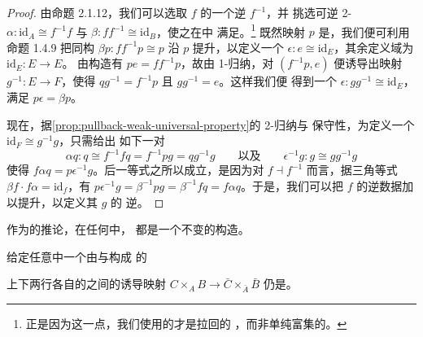 \begin{proof}
由命题 2.1.12，我们可以选取 $f$ 的一个\trAdjointEquivalence{}逆 $f^{-1}$，并%
挑选可逆 2-\trCell{} $\alpha\colon\mathrm{id}_A\cong f^{-1}f$ 与%
$\beta\colon ff^{-1}\cong\mathrm{id}_B$，使之在\trHomotopyTwoCategory{}中%
满足\trTriangleEqualities{}。\footnote{正是因为这一点，我们使用的才是拉回的%
\trBicategory\trUniversalProperty，而非单纯富集的\trUniversalProperty。}
既然映射 $p$ 是\trIsofibration{}，我们便可利用命题 1.4.9 把同构%
$\beta p\colon ff^{-1}p\cong p$ 沿 $p$ 提升，以定义一个\trIsomorphism{}%
$\epsilon\colon e\cong\mathrm{id}_E$，其余定义域为 $\mathrm{id}_E\colon E\to E$。%
由构造有 $pe=ff^{-1}p$，故由 1-\trCell{}归纳，对 $(f^{-1}p,e)$ 便诱导出映射%
$g^{-1}\colon E\to F$，使得 $qg^{-1}=f^{-1}p$ 且 $gg^{-1}=e$。这样我们便%
得到一个\trIsomorphism{} $\epsilon\colon gg^{-1}\cong\mathrm{id}_E$，满足%
$p\epsilon=\beta p$。

现在，据\cref{prop:pullback-weak-universal-property}的 2-\trCell{}归纳与%
保守性，为定义一个\trIsomorphism{} $\mathrm{id}_F\cong g^{-1}g$，只需给出%
如下一对\trIsomorphism
\[
\alpha q\colon q\cong f^{-1}fq=f^{-1}pg=qg^{-1}g
\qquad\text{以及}\qquad
\epsilon^{-1}g\colon g\cong gg^{-1}g
\]
使得 $f\alpha q=p\epsilon^{-1}g$。后一等式之所以成立，是因为对%
\trAdjointEquivalence{} $f\dashv f^{-1}$ 而言，据三角等式%
$\beta f\cdot f\alpha=\mathrm{id}_f$，有%
$p\epsilon^{-1}g=\beta^{-1}pg=\beta^{-1}fq=f\alpha q$。于是，我们可以把 $f$ %
的逆\trEquivalence{}数据加以提升，以定义其\trPullback{} $g$ 的%
逆\trEquivalence{}。
\end{proof}

作为\trRightProperness{}的推论，在任何\trInfinityCosmos{}中，\trPullback{}%
都是一个\trEquivalence{}不变的构造。

\begin{proposition}\label{prop:pullback-invariance}
给定任意\trInfinityCosmos{}中一个由\trIsofibration{}与\trEquivalence{}构成%
的\trDiagram
\begin{center}
\end{center}
上下两行各自的\trPullback{}之间的诱导映射%
$C\times_AB\to\bar{C}\times_{\bar{A}}\bar{B}$ 仍是\trEquivalence{}。
\end{proposition}

